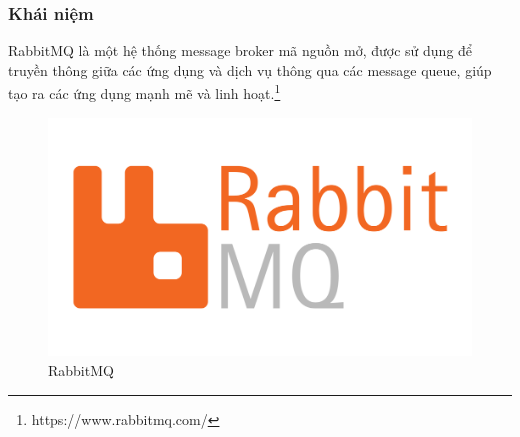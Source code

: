 \subsubsection{Khái niệm}
\noindent RabbitMQ là một hệ thống message broker mã nguồn mở, được sử dụng để truyền thông giữa các ứng dụng và dịch vụ thông qua các message queue, giúp tạo ra các ứng dụng mạnh mẽ và linh hoạt.\footnote{https://www.rabbitmq.com/}
\begin{figure}[H]
  \begin{center}
    \includegraphics[scale=0.3]{images/hieu/phuluc/rabbitmq.png}
    \caption{RabbitMQ}
  \end{center}
\end{figure}

